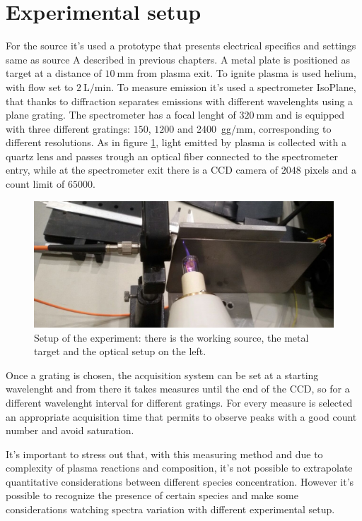 \section{Experimental setup}
For the source it's used a prototype that presents electrical specifics and settings same as source A described in previous chapters. A metal plate is positioned as target at a distance of $\SI{10}{\milli\meter}$ from plasma exit. To ignite plasma is used helium, with flow set to $\SI{2}{\liter/\minute}$.
To measure emission it's used a spectrometer IsoPlane, that thanks to diffraction separates emissions with different wavelenghts using a plane grating. The spectrometer has a focal lenght of $\SI{320}{\milli\meter}$ and is equipped with three different gratings: $\num{150}$, $\num{1200}$ and \SI{2400}{gg/\milli\meter}, corresponding to different resolutions. %
As in figure \ref{fig:app}, light emitted by plasma is collected with a quartz lens %
and passes trough an optical fiber %
connected to the spectrometer entry, while at the spectrometer exit there is a CCD camera of $2048$ pixels and a count limit of $\num{65000}$.
\begin{figure}
\centering
\includegraphics[width=.6\textwidth]{Images/Spectroscopy/apparato.jpg}
\caption{Setup of the experiment: there is the working source, the metal target and the optical setup on the left.}
\label{fig:app}
\end{figure}

Once a grating is chosen, the acquisition system can be set at a starting wavelenght and from there it takes measures until the end of the CCD, so for a different wavelenght interval for different gratings.
For every measure is selected an appropriate acquisition time that permits to observe peaks with a good count number and avoid saturation.

It's important to stress out that, with this measuring method and due to complexity of plasma reactions and composition, it's not possible to extrapolate quantitative considerations between different species concentration. However it's possible to recognize the presence of certain species and make some considerations watching spectra variation with different experimental setup.


